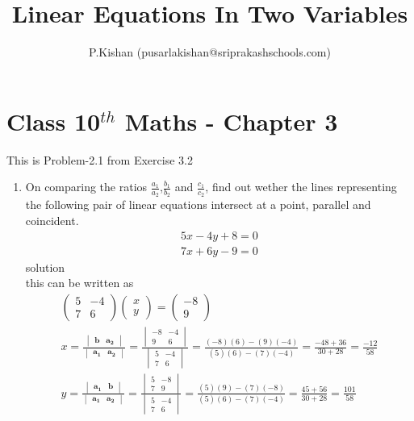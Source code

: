 \documentclass[10pt]{article}
\title{Linear Equations In Two Variables}
\author{P.Kishan (pusarlakishan@sriprakashschools.com)}
\newcommand{\myvec}[1]{\ensuremath{\begin{pmatrix}#1\end{pmatrix}}}
\newcommand{\mydet}[1]{\ensuremath{\begin{vmatrix}#1\end{vmatrix}}}
\let\vec\mathbf
\begin{document}
\maketitle
\section*{Class 10$^{th}$ Maths - Chapter 3}
This is Problem-2.1 from Exercise 3.2
\begin{enumerate}
\item On comparing the ratios $\frac{a_1}{a_2}$,$\frac{b_1}{b_2}$ and $\frac{c_1}{c_2}$, find out wether the lines representing the following pair of linear equations intersect at a point, parallel and coincident.\\
\begin{align} 
5x-4y+8=0\\
7x+6y-9=0
\end{align}
solution \\
this can be written as \\
\begin{align}
\myvec{5&-4\\7&6}\myvec{x\\y}=\myvec{-8\\9}\\   
x=\frac{\mydet{ \vec{b} & \vec{a_2}}}{\mydet{ \vec{a_1} &\vec{a_2} }}=
\frac{\mydet{-8&-4 \\ 9 & 6 }}{\mydet{5&-4\\7&6}} =
\frac{(-8)(6)-(9)(-4)}{(5)(6)-(7)(-4)} =
\frac{-48+36}{30+28}=\frac{-12}{58}\\
y=\frac{\mydet{\vec{a_1}&\vec{b}}}{\mydet{\vec{a_1}&\vec{a_2}}} =
\frac{\mydet{5&-8\\7&9}}{\mydet{5&-4\\7&6}}=
\frac{(5)(9)-(7)(-8)}{(5)(6)-(7)(-4)}=
\frac{45+56}{30+28}=\frac{101}{58} 
\end{align}
\end{enumerate}
\end{document}
